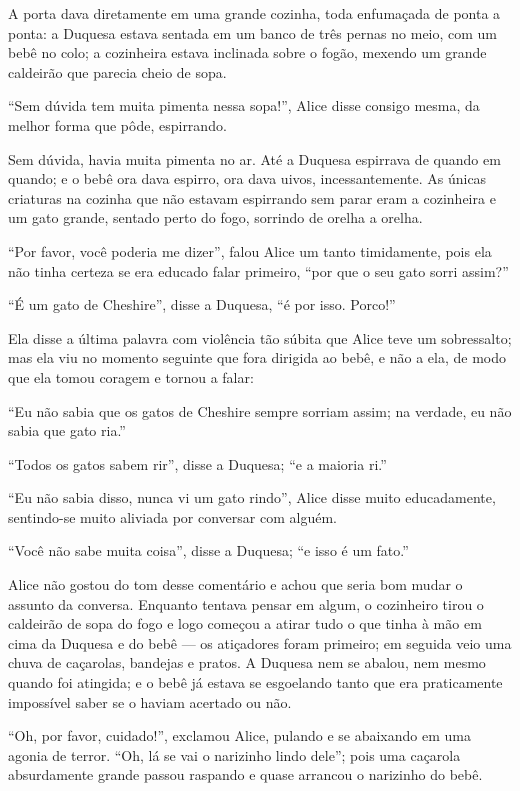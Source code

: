A porta dava diretamente em uma grande cozinha, toda
enfumaçada de ponta a ponta: a Duquesa estava sentada em um banco de
três pernas no meio, com um bebê no colo; a cozinheira estava inclinada
sobre o fogão, mexendo um grande caldeirão que parecia cheio de sopa.

``Sem dúvida tem muita pimenta nessa sopa!'', Alice disse consigo mesma,
da melhor forma que pôde, espirrando.

Sem dúvida, havia muita pimenta no ar. Até a Duquesa espirrava de
quando em quando; e o bebê ora dava espirro, ora dava uivos,
incessantemente. As únicas criaturas na cozinha que não estavam
espirrando sem parar eram a cozinheira e um gato grande, sentado perto
do fogo, sorrindo de orelha a orelha.

``Por favor, você poderia me dizer'', falou Alice um tanto timidamente,
pois ela não tinha certeza se era educado falar primeiro, ``por que o
seu gato sorri assim?''

``É um gato de Cheshire'', disse a Duquesa, ``é por isso. Porco!''

Ela disse a última palavra com violência tão súbita que Alice teve um
sobressalto; mas ela viu no momento seguinte que fora dirigida ao bebê,
e não a ela, de modo que ela tomou coragem e tornou a falar:

``Eu não sabia que os gatos de Cheshire sempre sorriam assim; na
verdade, eu não sabia que gato ria.''

``Todos os gatos sabem rir'', disse a Duquesa; ``e a maioria ri.''

``Eu não sabia disso, nunca vi um gato rindo'', Alice disse muito
educadamente, sentindo-se muito aliviada por conversar com alguém.

``Você não sabe muita coisa'', disse a Duquesa; ``e isso é um fato.''

Alice não gostou do tom desse comentário e achou que seria bom mudar o
assunto da conversa. Enquanto tentava pensar em algum, o cozinheiro
tirou o caldeirão de sopa do fogo e logo começou a atirar tudo o que
tinha à mão em cima da Duquesa e do bebê --- os atiçadores foram
primeiro; em seguida veio uma chuva de caçarolas, bandejas e pratos. A
Duquesa nem se abalou, nem mesmo quando foi atingida; e o bebê já estava
se esgoelando tanto que era praticamente impossível saber se o haviam
acertado ou não.

``Oh, por favor, cuidado!'', exclamou Alice, pulando e se abaixando em
uma agonia de terror. ``Oh, lá se vai o narizinho lindo dele''; pois uma
caçarola absurdamente grande passou raspando e quase arrancou o
narizinho do bebê.

